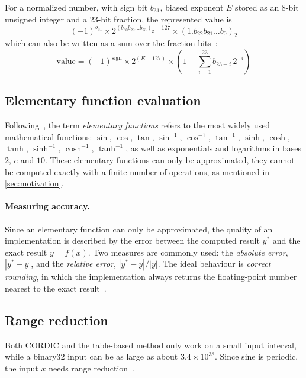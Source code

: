 For a normalized number, with sign bit $b_{31}$, biased exponent $E$ stored as an
8-bit unsigned integer and a 23-bit fraction, the represented value is
\begin{equation}
  (-1)^{b_{31}} \times 2^{(b_{30} b_{29} \dots b_{23})_2 - 127}
  \times (1.b_{22} b_{21} \dots b_{0})_2
  \label{eq:binary32-bits}
\end{equation}
which can also be written as a sum over the fraction bits~\cite{muller2020,wiki_binary32}:
\begin{equation}
  \text{value} = (-1)^{\text{sign}} \times 2^{(E-127)} \times
  \left( 1 + \sum_{i=1}^{23} b_{23-i}\, 2^{-i} \right)
  \label{eq:binary32}
\end{equation}

\subsection{Elementary function evaluation}
Following~\cite{muller2020}, the term \emph{elementary functions} refers to the most widely used mathematical functions: $\sin$, $\cos$, $\tan$, $\sin^{-1}$, $\cos^{-1}$, $\tan^{-1}$, $\sinh$, $\cosh$, $\tanh$, $\sinh^{-1}$, $\cosh^{-1}$, $\tanh^{-1}$, as well as exponentials and logarithms in bases $2$, $e$ and $10$.
These elementary functions can only be approximated, they cannot be computed exactly with a finite number of operations, as mentioned in \cref{sec:motivation}.

\paragraph{Measuring accuracy.}
Since an elementary function can only be approximated, the quality of an implementation is described by the error between the computed result $y^{*}$ and the exact result $y = f(x)$. Two measures are commonly used: the \emph{absolute error}, $|y^{*} - y|$, and the \emph{relative error}, $|y^{*} - y| / |y|$.
The ideal behaviour is \emph{correct rounding}, in which the implementation always returns the floating-point number nearest to the exact result~\cite{muller2020}.

\subsection{Range reduction}
\label{sec:range-reduction-intro}

Both CORDIC and the table-based method only work on a small input interval,
while a binary32 input can be as large as about $3.4 \times 10^{38}$.
Since sine is periodic, the input $x$ needs range reduction~\cite{ly2026payne}.

